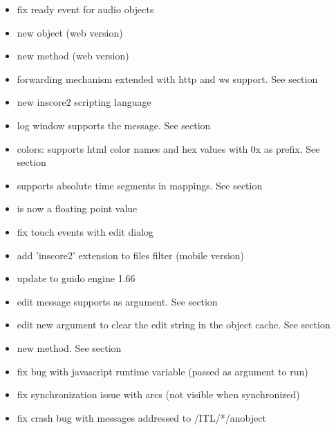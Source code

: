 \inscoreweb
\begin{itemize}
\item fix ready event for audio objects
\end{itemize}

\inscoreweb
\begin{itemize}
\item new  object (web version)
\item new  method (web version)
\item forwarding mechanism extended with http and ws support. See section 
\end{itemize}


\begin{itemize}
\item new inscore2 scripting language
\item log window supports the  message. See section 
\item colors: supports html color names and hex values with 0x as prefix. See section 
\item supports absolute time segments in mappings. See section 
\item {} is now a floating point value
\item fix touch events with edit dialog
\item add 'inscore2' extension to files filter (mobile version)
\item update to guido engine 1.66
\item edit message supports  as argument. See section 
\item edit new  argument to clear the edit string in the object cache. See section 
\item new  method. See section 
\item fix bug with javascript runtime variable (passed as argument to run)
\item fix synchronization issue with arcs (not visible when synchronized)
\item fix crash bug with  messages addressed to /ITL/*/anobject
\end{itemize}

